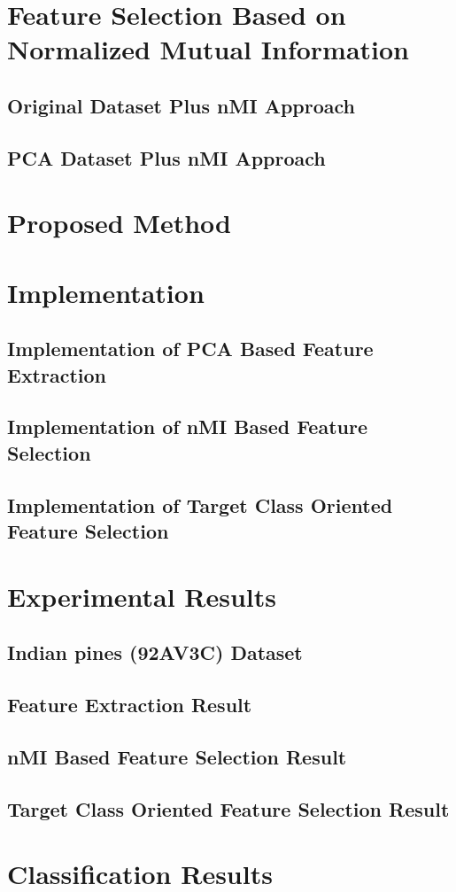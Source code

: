 \documentclass[document.tex]{subfiles}
\begin{document}
\section{Feature Selection Based on Normalized Mutual Information}

\subsection{Original Dataset Plus nMI Approach}
\subsection{PCA Dataset Plus nMI Approach}

\section{Proposed Method}

\section{Implementation}

\subsection{Implementation of PCA Based Feature Extraction}
\subsection{Implementation of nMI Based Feature Selection}
\subsection{Implementation of Target Class Oriented Feature Selection}

\section{Experimental Results}

\subsection{Indian pines (92AV3C) Dataset}
\subsection{Feature Extraction Result}
\subsection{nMI Based Feature Selection Result}
\subsection{Target Class Oriented Feature Selection Result}
\section{Classification Results}
\end{document}
